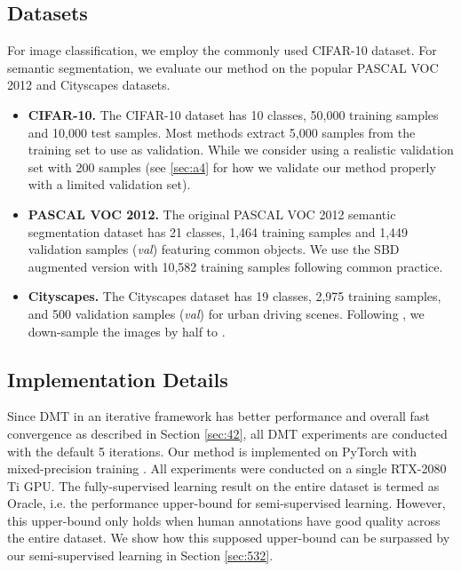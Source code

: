 \documentclass[preprint,review,10pt]{elsarticle}
\begin{document}
\subsection{Datasets}
\label{sec:51}

For image classification, we employ the commonly used CIFAR-10 \cite{krizhevsky2009learning} dataset. For semantic segmentation, we evaluate our method on the popular PASCAL VOC 2012 \cite{everingham2015pascal} and Cityscapes \cite{cordts2016cityscapes} datasets.








\begin{itemize}
\item \textbf{CIFAR-10.} The CIFAR-10 \cite{krizhevsky2009learning} dataset has 10 classes, 50,000 training samples and 10,000 test samples. Most methods extract 5,000 samples from the training set to use as validation. While we consider using a realistic \cite{oliver2018realistic} validation set with 200 samples (see \ref{sec:a4} for how we validate our method properly with a limited validation set).

\item \textbf{PASCAL VOC 2012.} The original PASCAL VOC 2012 \cite{everingham2015pascal} semantic segmentation dataset has 21 classes, 1,464 training samples and 1,449 validation samples (\textit{val}) featuring common objects. We use the SBD \cite{hariharan2011semantic} augmented version with 10,582 training samples following common practice.

\item \textbf{Cityscapes.} The Cityscapes \cite{cordts2016cityscapes} dataset has 19 classes, 2,975 training samples, and 500 validation samples (\textit{val}) for urban driving scenes. Following \cite{mittal2019semi}, we down-sample the images by half to .
\end{itemize}


\subsection{Implementation Details}
\label{sec:52}
Since DMT in an iterative framework has better performance and overall fast convergence as described in Section \ref{sec:42}, all DMT experiments are conducted with the default 5 iterations. Our method is implemented on PyTorch with mixed-precision training \cite{DBLP:conf/iclr/MicikeviciusNAD18}. All experiments were conducted on a single RTX-2080 Ti GPU. The fully-supervised learning result on the entire dataset is termed as Oracle, i.e. the performance upper-bound for semi-supervised learning. However, this upper-bound only holds when human annotations have good quality across the entire dataset. We show how this supposed upper-bound can be surpassed by our semi-supervised learning in Section \ref{sec:532}.
\end{document}
